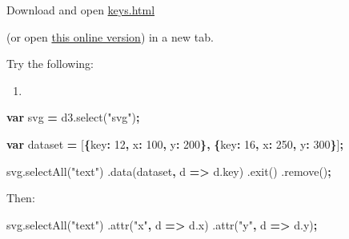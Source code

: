 \documentclass[openany]{book}
\newenvironment{Shaded}{\begin{snugshade}}{\end{snugshade}}
\newcommand{\AttributeTok}[1]{\textcolor[rgb]{0.77,0.63,0.00}{#1}}
\newcommand{\DataTypeTok}[1]{\textcolor[rgb]{0.13,0.29,0.53}{#1}}
\newcommand{\DecValTok}[1]{\textcolor[rgb]{0.00,0.00,0.81}{#1}}
\newcommand{\KeywordTok}[1]{\textcolor[rgb]{0.13,0.29,0.53}{\textbf{#1}}}
\newcommand{\NormalTok}[1]{#1}
\newcommand{\OperatorTok}[1]{\textcolor[rgb]{0.81,0.36,0.00}{\textbf{#1}}}
\newcommand{\StringTok}[1]{\textcolor[rgb]{0.31,0.60,0.02}{#1}}
\newcommand{\VariableTok}[1]{\textcolor[rgb]{0.00,0.00,0.00}{#1}}
\begin{document}
Download and open \href{code/keys.html}{keys.html}

(or open \href{https://jtr13.github.io/D3/DataBindwithKeys.html}{this online version}) in a new tab.

Try the following:

\begin{enumerate}
\def\labelenumi{\arabic{enumi}.}
\item
\end{enumerate}

\begin{Shaded}
\begin{Highlighting}[]
\KeywordTok{var}\NormalTok{ svg }\OperatorTok{=} \VariableTok{d3}\NormalTok{.}\AttributeTok{select}\NormalTok{(}\StringTok{"svg"}\NormalTok{)}\OperatorTok{;}

\KeywordTok{var}\NormalTok{ dataset }\OperatorTok{=}\NormalTok{ [}\OperatorTok{\{}\DataTypeTok{key}\OperatorTok{:} \DecValTok{12}\OperatorTok{,} \DataTypeTok{x}\OperatorTok{:} \DecValTok{100}\OperatorTok{,} \DataTypeTok{y}\OperatorTok{:} \DecValTok{200}\OperatorTok{\},}
              \OperatorTok{\{}\DataTypeTok{key}\OperatorTok{:} \DecValTok{16}\OperatorTok{,} \DataTypeTok{x}\OperatorTok{:} \DecValTok{250}\OperatorTok{,} \DataTypeTok{y}\OperatorTok{:} \DecValTok{300}\OperatorTok{\}}\NormalTok{]}\OperatorTok{;}
              
\VariableTok{svg}\NormalTok{.}\AttributeTok{selectAll}\NormalTok{(}\StringTok{"text"}\NormalTok{)}
\NormalTok{  .}\AttributeTok{data}\NormalTok{(dataset}\OperatorTok{,}\NormalTok{ d }\OperatorTok{=>} \VariableTok{d}\NormalTok{.}\AttributeTok{key}\NormalTok{)}
\NormalTok{  .}\AttributeTok{exit}\NormalTok{()}
\NormalTok{  .}\AttributeTok{remove}\NormalTok{()}\OperatorTok{;}
\end{Highlighting}
\end{Shaded}

Then:

\begin{Shaded}
\begin{Highlighting}[]
\VariableTok{svg}\NormalTok{.}\AttributeTok{selectAll}\NormalTok{(}\StringTok{"text"}\NormalTok{)}
\NormalTok{  .}\AttributeTok{attr}\NormalTok{(}\StringTok{"x"}\OperatorTok{,}\NormalTok{ d }\OperatorTok{=>} \VariableTok{d}\NormalTok{.}\AttributeTok{x}\NormalTok{)}
\NormalTok{  .}\AttributeTok{attr}\NormalTok{(}\StringTok{"y"}\OperatorTok{,}\NormalTok{ d }\OperatorTok{=>} \VariableTok{d}\NormalTok{.}\AttributeTok{y}\NormalTok{)}\OperatorTok{;}
\end{Highlighting}
\end{Shaded}
\end{document}
